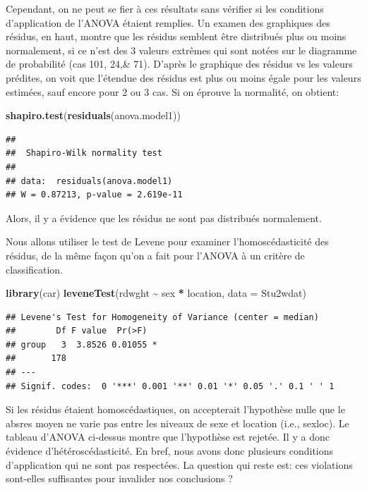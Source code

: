 \documentclass[
  12pt,
]{book}
\newenvironment{Shaded}{\begin{snugshade}}{\end{snugshade}}
\newcommand{\DataTypeTok}[1]{\textcolor[rgb]{0.13,0.29,0.53}{#1}}
\newcommand{\KeywordTok}[1]{\textcolor[rgb]{0.13,0.29,0.53}{\textbf{#1}}}
\newcommand{\NormalTok}[1]{#1}
\newcommand{\OperatorTok}[1]{\textcolor[rgb]{0.81,0.36,0.00}{\textbf{#1}}}
\newcommand{\StringTok}[1]{\textcolor[rgb]{0.31,0.60,0.02}{#1}}
\begin{document}
Cependant, on ne peut se fier à ces résultats sans vérifier si les conditions d'application de l'ANOVA étaient remplies. Un examen des graphiques des résidus, en haut, montre que les résidus semblent être distribués plus ou moins normalement, si ce n'est des 3 valeurs extrêmes qui sont notées sur le diagramme de probabilité (cas 101, 24,\& 71). D'après le graphique des résidus vs les valeurs prédites, on voit que l'étendue des résidus est plus ou moins égale pour les valeurs estimées, sauf encore pour 2 ou 3 cas. Si on éprouve la normalité, on obtient:

\begin{Shaded}
\begin{Highlighting}[]
\KeywordTok{shapiro.test}\NormalTok{(}\KeywordTok{residuals}\NormalTok{(anova.model1))}
\end{Highlighting}
\end{Shaded}

\begin{verbatim}
## 
##  Shapiro-Wilk normality test
## 
## data:  residuals(anova.model1)
## W = 0.87213, p-value = 2.619e-11
\end{verbatim}

Alors, il y a évidence que les résidus ne sont pas distribués normalement.

Nous allons utiliser le test de Levene pour examiner l'homoscédasticité des résidus, de la même façon qu'on a fait pour l'ANOVA à un critère de classification.

\begin{Shaded}
\begin{Highlighting}[]
\KeywordTok{library}\NormalTok{(car)}
\KeywordTok{leveneTest}\NormalTok{(rdwght }\OperatorTok{\textasciitilde{}}\StringTok{ }\NormalTok{sex }\OperatorTok{*}\StringTok{ }\NormalTok{location, }\DataTypeTok{data =}\NormalTok{ Stu2wdat)}
\end{Highlighting}
\end{Shaded}

\begin{verbatim}
## Levene's Test for Homogeneity of Variance (center = median)
##        Df F value  Pr(>F)  
## group   3  3.8526 0.01055 *
##       178                  
## ---
## Signif. codes:  0 '***' 0.001 '**' 0.01 '*' 0.05 '.' 0.1 ' ' 1
\end{verbatim}

Si les résidus étaient homoscédastiques, on accepterait l'hypothèse nulle que le absres moyen ne varie pas entre les niveaux de sexe et location (i.e., sexloc). Le tableau d'ANOVA ci-dessus montre que l'hypothèse est rejetée. Il y a donc évidence d'hétéroscédasticité. En bref, nous avons donc plusieurs conditions d'application qui ne sont pas respectées. La question qui reste est: ces violations sont-elles suffisantes pour invalider nos conclusions ?
\end{document}
